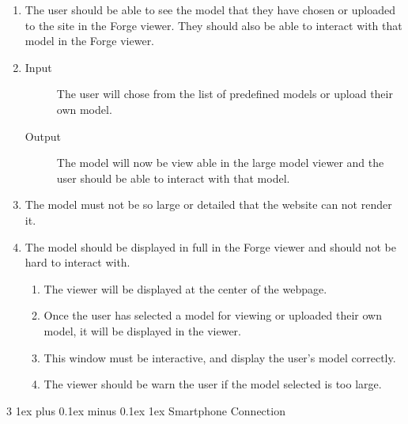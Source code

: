 \documentclass[letterpaper, 10pt, draftclsnofoot, compsoc, onecolumn]{IEEEtran}
\makeatletter
\def\subsubsection{\@startsection{subsubsection}%
                                 {3}%
                                 {\z@}%
                                 {1ex plus 0.1ex minus 0.1ex}%
                                 {1ex}%
                                 {\normalfont\normalsize}}%
\makeatother
\begin{document}
\begin{enumerate}
	\item	The user should be able to see the model that they have chosen or uploaded to the site in the Forge viewer. They 
	should also be able to interact with that model in the Forge viewer. 

	\item
	\begin{description}
		\item[Input] The user will chose from the list of predefined models or upload their own model. 
		\item[Output] The model will now be view able in the large model viewer and the user should be able to interact with that model.
	\end{description}

	\item The model must not be so large or detailed that the website can not render it.

	\item The model should be displayed in full in the Forge viewer and should not be hard to interact with. 

	\begin{enumerate}
		\item The viewer will be displayed at the center of the webpage.
		\item Once the user has selected a model for viewing or uploaded their own model, it will be displayed in the viewer. 
		\item This window must be interactive, and display the user's model correctly.
		\item The viewer should be warn the user if the model selected is too large. 
	\end{enumerate}
\end{enumerate}

\subsubsection{Smartphone Connection}
\end{document}
